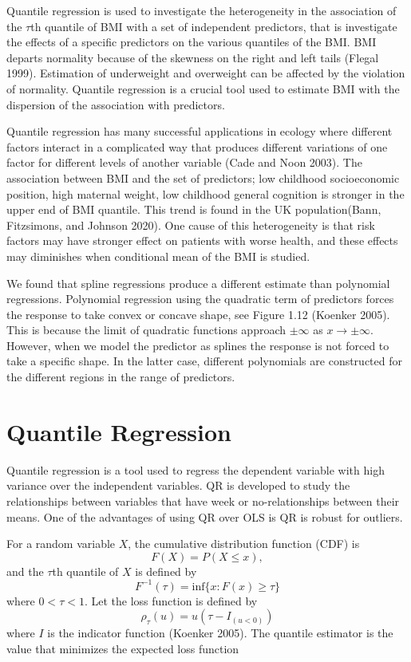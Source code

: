 \documentclass[
  12pt,
]{article}
\begin{document}
Quantile regression is used to investigate the heterogeneity in the association of the \(\tau\)th quantile of BMI with a set of independent predictors, that is investigate the effects of a specific predictors on the various quantiles of the BMI. BMI departs normality because of the skewness on the right and left tails (Flegal 1999). Estimation of underweight and overweight can be affected by the violation of normality. Quantile regression is a crucial tool used to estimate BMI with the dispersion of the association with predictors.

Quantile regression has many successful applications in ecology where different factors interact in a complicated way that produces different variations of one factor for different levels of another variable (Cade and Noon 2003). The association between BMI and the set of predictors; low childhood socioeconomic position, high maternal weight, low childhood general cognition is stronger in the upper end of BMI quantile. This trend is found in the UK population(Bann, Fitzsimons, and Johnson 2020). One cause of this heterogeneity is that risk factors may have stronger effect on patients with worse health, and these effects may diminishes when conditional mean of the BMI is studied.

We found that spline regressions produce a different estimate than polynomial regressions. Polynomial regression using the quadratic term of predictors forces the response to take convex or concave shape, see Figure 1.12 (Koenker 2005). This is because the limit of quadratic functions approach \(\pm\infty\) as \(x\rightarrow\pm\infty.\) However, when we model the predictor as splines the response is not forced to take a specific shape. In the latter case, different polynomials are constructed for the different regions in the range of predictors.

\section{Quantile Regression}

Quantile regression is a tool used to regress the dependent variable with high variance over the independent variables. QR is developed to study the relationships between variables that have week or no-relationships between their means. One of the advantages of using QR over OLS is QR is robust for outliers.

For a random variable \(X\), the cumulative distribution function (CDF) is \[F(X)=P(X\leq x),\] and the \(\tau\)th quantile of \(X\) is defined by \[ F^{-1}(\tau)=\text{inf}\{x: F(x)\ge \tau\} \] where \(0<\tau<1\).
Let the loss function is defined by \[\rho_{\tau}(u)= u(\tau-I_{(u<0)})\] where \(I\) is the indicator function (Koenker 2005). The quantile estimator is the value that minimizes the expected loss function
\end{document}
